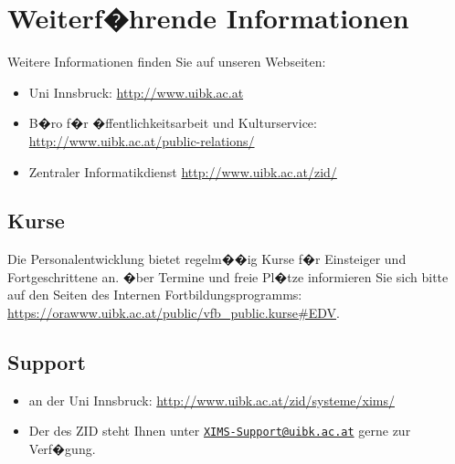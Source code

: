 \section{Weiterf�hrende Informationen}
\label{infos}

Weitere Informationen finden Sie auf unseren Webseiten:

\begin{itemize}
	\item {Uni Innsbruck: \url{http://www.uibk.ac.at}}
	\item {B�ro f�r �ffentlichkeitsarbeit und Kulturservice: \url{http://www.uibk.ac.at/public-relations/}}
	\item {Zentraler Informatikdienst \url{http://www.uibk.ac.at/zid/}}
\end{itemize}

\subsection{Kurse}
Die Personalentwicklung bietet regelm��ig Kurse f�r Einsteiger und Fortgeschrittene an. �ber Termine und freie Pl�tze informieren Sie sich bitte auf den Seiten des Internen Fortbildungsprogramms: \url{https://orawww.uibk.ac.at/public/vfb_public.kurse#EDV}.

\subsection{Support}
\label{support}

\begin{itemize}
	\item { an der Uni Innsbruck: \url{http://www.uibk.ac.at/zid/systeme/xims/}}
	\item Der  des ZID steht Ihnen unter \href{mailto:XIMS-Support@uibk.ac.at}{\nolinkurl{XIMS-Support@uibk.ac.at}} gerne zur Verf�gung.
\end{itemize}